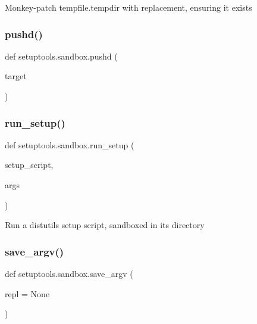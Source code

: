 \begin{DoxyVerb}Monkey-patch tempfile.tempdir with replacement, ensuring it exists
\end{DoxyVerb}
 \mbox{\label{namespacesetuptools_1_1sandbox_a7971928fb0fbf584da85d366379232d3}} 
\subsubsection{\texorpdfstring{pushd()}{pushd()}}
{\footnotesize\ttfamily def setuptools.\+sandbox.\+pushd (\begin{DoxyParamCaption}\item[{}]{target }\end{DoxyParamCaption})}

\mbox{\label{namespacesetuptools_1_1sandbox_ac27deefbd9b5163ee6861eb07b93bc23}} 
\subsubsection{\texorpdfstring{run\+\_\+setup()}{run\_setup()}}
{\footnotesize\ttfamily def setuptools.\+sandbox.\+run\+\_\+setup (\begin{DoxyParamCaption}\item[{}]{setup\+\_\+script,  }\item[{}]{args }\end{DoxyParamCaption})}

\begin{DoxyVerb}Run a distutils setup script, sandboxed in its directory\end{DoxyVerb}
 \mbox{\label{namespacesetuptools_1_1sandbox_a2a79966d30bf09df3b132b92a596738c}} 
\subsubsection{\texorpdfstring{save\+\_\+argv()}{save\_argv()}}
{\footnotesize\ttfamily def setuptools.\+sandbox.\+save\+\_\+argv (\begin{DoxyParamCaption}\item[{}]{repl = {\ttfamily None} }\end{DoxyParamCaption})}

